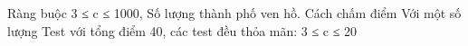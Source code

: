 Ràng buộc  
3 ≤ c ≤ 1000, Số lượng thành phố ven hồ.
   Cách chấm điểm  
Với một số lượng Test với tổng điểm 40, các test đều thỏa mãn: 3 ≤ c ≤ 20